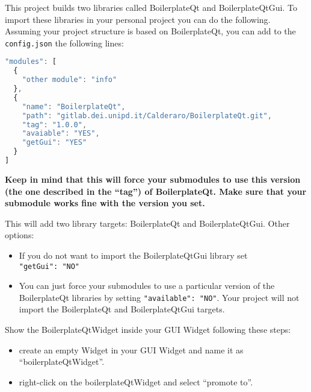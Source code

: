 
This project builds two libraries called BoilerplateQt and
BoilerplateQtGui. To import these libraries in your personal project you
can do the following. Assuming your project structure is based on
BoilerplateQt, you can add to the \texttt{config.json} the following
lines:

\begin{lstlisting}[language=javascript]
"modules": [
  {
    "other module": "info"
  },
  {
    "name": "BoilerplateQt",
    "path": "gitlab.dei.unipd.it/Calderaro/BoilerplateQt.git",
    "tag": "1.0.0",
    "avaiable": "YES",
    "getGui": "YES"
  }
]
\end{lstlisting}

\textbf{Keep in mind that this will force your submodules to use this version (the one described in the ``tag'') of BoilerplateQt. Make sure that your submodule works fine with the version you set.}

This will add two library targets: BoilerplateQt and BoilerplateQtGui.
Other options:

\begin{itemize}
  \item
        If you do not want to import the BoilerplateQtGui library set
        \texttt{"getGui":\ "NO"}
\end{itemize}

\begin{itemize}
  \item
        You can just force your submodules to use a particular version of the
        BoilerplateQt libraries by setting \texttt{"available":\ "NO"}. Your
        project will not import the BoilerplateQt and BoilerplateQtGui
        targets.
\end{itemize}


Show the BoilerplateQtWidget inside your GUI Widget following these
steps:

\begin{itemize}
  \item
        create an empty Widget in your GUI Widget and name it as
        ``boilerplateQtWidget''.
\end{itemize}

\begin{itemize}
  \item
        right-click on the boilerplateQtWidget and select ``promote to''.
\end{itemize}

